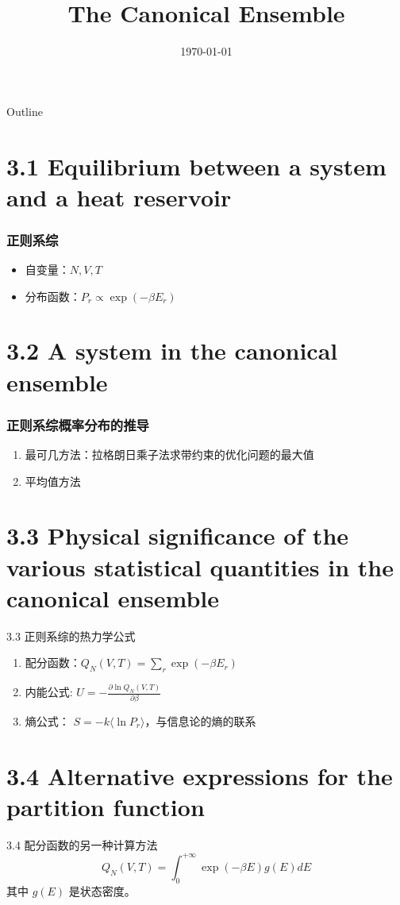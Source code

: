 \documentclass{ctexbeamer}
\title{The Canonical Ensemble}
\date{\today}
\begin{document}
\begin{frame}
	\titlepage
\end{frame}
\begin{frame}{Outline}
    \tableofcontents
\end{frame}
\section{3.1 Equilibrium between 
a system and a heat reservoir
}

\begin{frame}
\frametitle{正则系综}
\begin{itemize}
    \item 自变量：$N,V,T$
    \item 分布函数：$P_r \propto \exp(-\beta E_r)$
\end{itemize}

\end{frame}
\section{3.2 A system in the canonical ensemble
}
\begin{frame}
    \frametitle{正则系综概率分布的推导}
    \begin{enumerate}
        \item 最可几方法：拉格朗日乘子法求带约束的优化问题的最大值
        \item 平均值方法
    \end{enumerate}
    
    \end{frame}
\section{3.3 Physical significance of the various statistical quantities in
the canonical ensemble}
\begin{frame}{3.3 正则系综的热力学公式}
    \begin{enumerate}
        \item 配分函数：$Q_N(V,T) = \sum_{r} \exp(- \beta E_r)$
        \item 内能公式: $U=-\frac{\partial \ln Q_N(V,T)}{\partial \beta}$
        \item 熵公式： $S=-k\langle \ln P_r \rangle$，与信息论的熵的联系
    \end{enumerate}
\end{frame}
\section{3.4 Alternative expressions for the partition function}
\begin{frame}{3.4 配分函数的另一种计算方法}
    \begin{equation*}
        Q_N(V,T) = \int_0^{+\infty} \exp(-\beta E) g(E) dE        
    \end{equation*}
    其中 $g(E)$ 是状态密度。
\end{frame}
\end{document}
